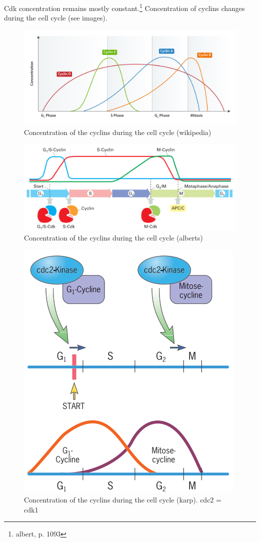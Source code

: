 \documentclass{article}
\begin{document}
	Cdk concentration remains mostly constant.\footnote{albert, p. 1093} Concentration of cyclins changes during the cell cycle (see images).
	
	\begin{figure}[H]
		\centering
		\includegraphics[width=\linewidth]{cyclin_activity_wikipedia.png}
		\caption{Concentration of the cyclins during the cell cycle (wikipedia)}
	\end{figure}
	
	\begin{figure}[H]
		\centering
		\includegraphics[width=\linewidth]{cyclin_activity_alberts.png}
		\caption{Concentration of the cyclins during the cell cycle (alberts)}
	\end{figure}
	
	\begin{figure}[H]
		\centering
		\includegraphics[width=0.8\linewidth]{cyclin_activity_karp.png}
		\caption{Concentration of the cyclins during the cell cycle (karp). cdc2 = cdk1}
	\end{figure}
\end{document}
